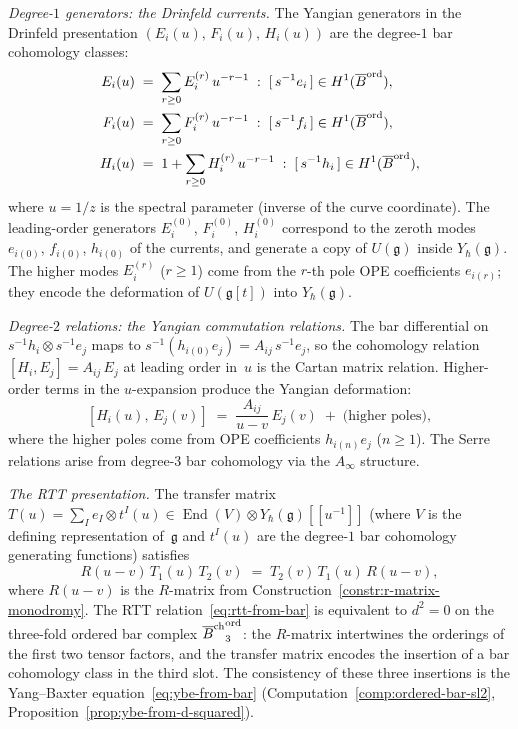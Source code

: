 \begin{construction}
\emph{Degree-$1$ generators: the Drinfeld currents.}
The Yangian generators in the Drinfeld presentation
$(E_i(u),\,F_i(u),\,H_i(u))$ are the degree-$1$ bar
cohomology classes:
\begin{align*}
E_i(u)&\;=\;\sum_{r\ge 0}E_i^{(r)}\,u^{-r-1}
\;:\;
[\,s^{-1}e_i\,]\in H^1(\overline{B}^{\mathrm{ord}}),\\
F_i(u)&\;=\;\sum_{r\ge 0}F_i^{(r)}\,u^{-r-1}
\;:\;
[\,s^{-1}f_i\,]\in H^1(\overline{B}^{\mathrm{ord}}),\\
H_i(u)&\;=\;1+\sum_{r\ge 0}H_i^{(r)}\,u^{-r-1}
\;:\;
[\,s^{-1}h_i\,]\in H^1(\overline{B}^{\mathrm{ord}}),
\end{align*}
where $u=1/z$ is the spectral parameter (inverse of the
curve coordinate). The leading-order generators
$E_i^{(0)}$, $F_i^{(0)}$, $H_i^{(0)}$ correspond to the
zeroth modes $e_{i(0)}$, $f_{i(0)}$, $h_{i(0)}$ of the
currents, and generate a copy of $U(\mathfrak g)$ inside
$Y_\hbar(\mathfrak g)$. The higher modes $E_i^{(r)}$
($r\ge 1$) come from the $r$-th pole OPE coefficients
$e_{i(r)}$; they encode the deformation of
$U(\mathfrak g[t])$ into $Y_\hbar(\mathfrak g)$.

\emph{Degree-$2$ relations: the Yangian commutation
relations.}
The bar differential on
$s^{-1}h_i\otimes s^{-1}e_j$ maps to $s^{-1}(h_{i(0)}e_j)
=A_{ij}\,s^{-1}e_j$, so the cohomology relation
$[H_i,E_j]=A_{ij}\,E_j$ at leading order in~$u$ is
the Cartan matrix relation. Higher-order terms in the
$u$-expansion produce the Yangian deformation:
\[
[H_i(u),\,E_j(v)]
\;=\;
\frac{A_{ij}}{u-v}\,E_j(v)
\;+\;\text{(higher poles)},
\]
where the higher poles come from OPE coefficients
$h_{i(n)}e_j$ ($n\ge 1$). The Serre relations arise from
degree-$3$ bar cohomology via the $A_\infty$ structure.

\emph{The RTT presentation.}
The transfer matrix
$T(u)=\sum_I e_I\otimes t^I(u)
\in\operatorname{End}(V)\otimes Y_\hbar(\mathfrak g)[\![u^{-1}]\!]$
(where $V$ is the defining representation of~$\mathfrak g$
and $t^I(u)$ are the degree-$1$ bar cohomology generating
functions) satisfies
\begin{equation}\label{eq:rtt-from-bar}
R(u{-}v)\,T_1(u)\,T_2(v)
\;=\;
T_2(v)\,T_1(u)\,R(u{-}v),
\end{equation}
where $R(u-v)$ is the $R$-matrix from
Construction~\ref{constr:r-matrix-monodromy}. The RTT
relation~\eqref{eq:rtt-from-bar} is equivalent to $d^2=0$
on the three-fold ordered bar complex
${\overline{B}^{\mathrm{ch}}}_3^{\mathrm{ord}}$: the $R$-matrix intertwines the
orderings of the first two tensor factors, and the transfer
matrix encodes the insertion of a bar cohomology class in
the third slot. The consistency of these three insertions
is the Yang--Baxter
equation~\eqref{eq:ybe-from-bar}
(Computation~\ref{comp:ordered-bar-sl2},
Proposition~\ref{prop:ybe-from-d-squared}).


\end{construction}
